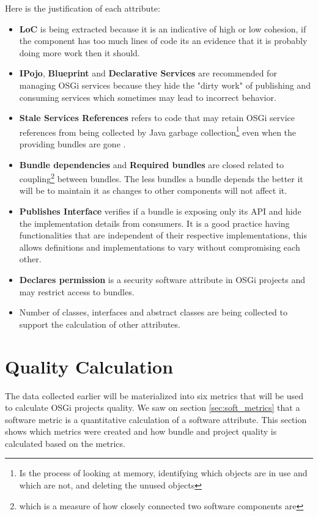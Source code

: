Here is the justification of each attribute:
\begin{itemize}
\item \textbf{LoC} is being extracted because it is an indicative of high or low cohesion, if the component has too much lines of code its an evidence that it is probably doing more work then it should. 
\item \textbf{IPojo}, \textbf{Blueprint} and \textbf{Declarative Services} are recommended for managing OSGi services because they hide the "dirty work" of publishing and consuming services which sometimes may lead to incorrect behavior. 
\item \textbf{Stale Services References} refers to code that may retain OSGi service references from being collected by Java garbage collection\footnote{Is the process of looking at memory, identifying which objects are in use and which are not, and deleting the unused objects} even when the providing bundles are gone \citep{Gama 2012}. 
\item \textbf{Bundle dependencies} and \textbf{Required bundles} are closed related to coupling\footnote{which is a measure of how closely connected two software components are} between bundles. The less bundles a bundle depends the better it will be to maintain it as changes to other components will not affect it. 
\item \textbf{Publishes Interface} verifies if a bundle is exposing only its API and hide the implementation details from consumers. It is a good practice having functionalities that are independent of their respective implementations, this allows definitions and implementations to vary without compromising each other. 
\item \textbf{Declares permission} is a security software attribute in OSGi projects and may restrict access to bundles. 
\item Number of classes, interfaces and abstract classes are being collected to support the calculation of other attributes. 
\end{itemize}

\section{Quality Calculation}
The data collected earlier will be materialized into six metrics that will be used to calculate OSGi projects quality. We saw on section \ref{sec:soft_metrics} that a software metric is a quantitative calculation of a software attribute. This section shows which metrics were created and how bundle and project quality is calculated based on the metrics.


